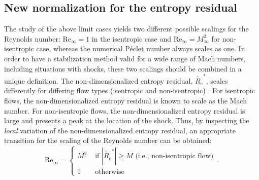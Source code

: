 \documentclass[preprint,10pt]{elsarticle}
\renewcommand{\Re}{\textrm{Re}}
\newcommand{\resi}{R_e}
\newcommand{\resinew}{\widetilde{\resi}}
\begin{document}
\subsection{New normalization for the entropy residual} \label{sec:new_normaliz}

The study of the above limit cases yields two different possible scalings for the Reynolds number: $\Re_\infty = 1$ in the isentropic case and $\Re_\infty  = M_\infty^2$ for non-isentropic case, whereas the numerical P\'eclet number always scales as one. In order to have a stabilization method valid for a wide range of Mach numbers, including situations with shocks, these two scalings should be combined in a unique definition. The non-dimensionalized entropy residual, $\resinew^*$, scales differently for differing flow types (isentropic and non-isentropic) \cite{alazard}. For isentropic flows, the non-dimensionalized entropy residual is known to scale as the Mach number. For non-isentropic flows, the non-dimensionalized entropy residual is large and presents a peak at the location of the shock. Thus, by inspecting the  \emph{local} variation of the non-dimensionalized entropy residual, an appropriate transition for the scaling of the Reynolds number can be obtained:
\begin{equation}  
\label{eq:norm_ent}
\Re_\infty =  \left\{
\begin{array}{ll}
M^2  & \text{ if } \left| \resinew^* \right| \geq M \text{ (i.e., non-isentropic flow)} \\
1    & \text{ otherwise}
\end{array}
\right.
\, .
\end{equation}
\end{document}
